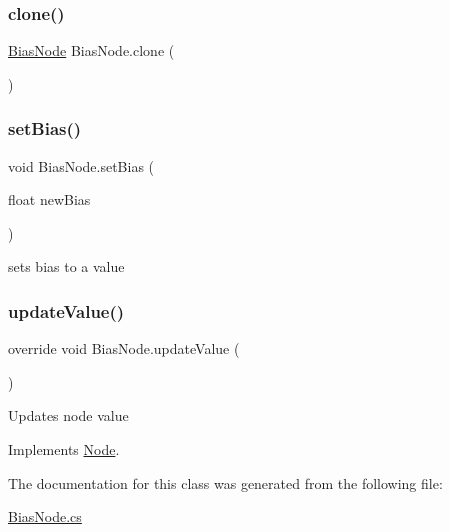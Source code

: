 \subsubsection{\texorpdfstring{clone()}{clone()}}
{\footnotesize\ttfamily \mbox{\hyperlink{class_bias_node}{Bias\+Node}} Bias\+Node.\+clone (\begin{DoxyParamCaption}{ }\end{DoxyParamCaption})}

\mbox{\label{class_bias_node_a73832b9f58014cc9f17788ce64f56989}} 
\subsubsection{\texorpdfstring{set\+Bias()}{setBias()}}
{\footnotesize\ttfamily void Bias\+Node.\+set\+Bias (\begin{DoxyParamCaption}\item[{float}]{new\+Bias }\end{DoxyParamCaption})}



sets bias to a value 

\mbox{\label{class_bias_node_a84e7e92b97256707aba057ec92bd7a79}} 
\subsubsection{\texorpdfstring{update\+Value()}{updateValue()}}
{\footnotesize\ttfamily override void Bias\+Node.\+update\+Value (\begin{DoxyParamCaption}{ }\end{DoxyParamCaption})\hspace{0.3cm}{\ttfamily [virtual]}}



Updates node value 



Implements \mbox{\hyperlink{class_node_a85ebd0e36c25430570b94f923afd2a62}{Node}}.



The documentation for this class was generated from the following file\+:\begin{DoxyCompactItemize}
\item 
\mbox{\hyperlink{_bias_node_8cs}{Bias\+Node.\+cs}}\end{DoxyCompactItemize}
